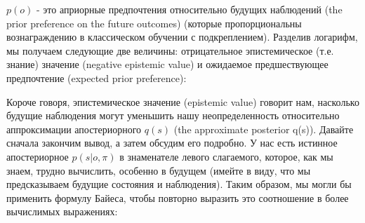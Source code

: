 \documentclass[12pt]{article}
\begin{document}
\begin{figure}[h]
\end{figure}

$p(o)$ - это априорные предпочтения относительно будущих наблюдений (the prior preference on the future outcomes) (которые пропорциональны вознаграждению в классическом обучении с подкреплением). Разделив логарифм, мы получаем следующие две величины:  отрицательное эпистемическое (т.е. знание) значение (negative epistemic value) и ожидаемое предшествующее предпочтение (expected prior preference):


\begin{figure}[h]
\end{figure}

Короче говоря, эпистемическое значение (epistemic value) говорит нам, насколько будущие наблюдения могут уменьшить нашу неопределенность относительно аппроксимации апостериорного $q(s)$ (the approximate posterior q(s)). Давайте сначала закончим вывод, а затем обсудим его подробно. У нас есть истинное апостериорное $p(s|o,\pi)$ в знаменателе левого слагаемого, которое, как мы знаем, трудно вычислить, особенно в будущем (имейте в виду, что мы предсказываем будущие состояния и наблюдения). Таким образом, мы могли бы применить формулу Байеса, чтобы повторно выразить это соотношение в более вычислимых выражениях:

\end{document}
